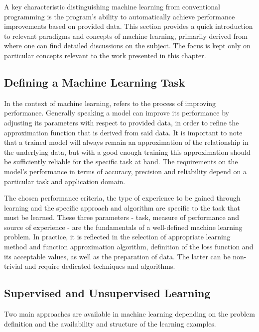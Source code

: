 A key characteristic distinguishing machine learning from conventional programming is the program's ability to automatically achieve performance improvements based on provided data.
This section provides a quick introduction to relevant paradigms and concepts of machine learning, primarily derived from~\cite{BOOK:Mitchell:Machine_Learning,BOOK:Hastie:Elements_Statistical_Learning} where one can find detailed discussions on the subject.
The focus is kept only on particular concepts relevant to the work presented in this chapter.

\subsection{Defining a Machine Learning Task}

In the context of machine learning,  refers to the process of improving performance.
Generally speaking a model can improve its performance by adjusting its parameters with respect to provided data, in order to refine the approximation function that is derived from said data. 
It is important to note that a trained model will always remain an approximation of the relationship in the underlying data, but with a good enough training this approximation should be sufficiently reliable for the specific task at hand.
The requirements on the model's performance in terms of accuracy, precision and reliability depend on a particular task and application domain.

The chosen performance criteria, the type of experience to be gained through learning and the specific approach and algorithm are specific to the task that must be learned.
These three parameters - task, measure of performance and source of experience - are the fundamentals of a well-defined machine learning problem.
In practice, it is reflected in the selection of appropriate learning method and function approximation algorithm, definition of the loss function and its acceptable values, as well as the preparation of data.
The latter can be non-trivial and require dedicated techniques and algorithms.

\subsection{Supervised and Unsupervised Learning}

Two main approaches are available in machine learning depending on the problem definition and the availability and structure of the learning examples.

